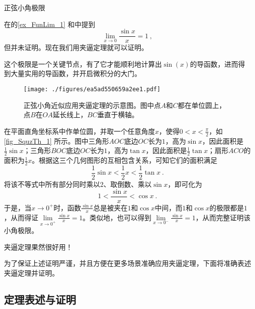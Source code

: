 \begin{example}{正弦小角极限}

在的\autoref{ex_FunLim_1} 和中提到
\begin{equation}
\lim_{x\to 0}\frac{\sin x}{x}=1~, 
\end{equation}
但并未证明。现在我们用夹逼定理就可以证明。

这个极限是一个关键节点，有了它才能顺利地计算出$\sin(x)$的导函数，进而得到大量实用的导函数，并开启微积分的大门。


\begin{figure}[ht]
\centering
\texttt{[image: ./figures/ea5ad550659a2ee1.pdf]}
\caption{正弦小角近似应用夹逼定理的示意图。图中点$A$和$C$都在单位圆上，点$B$在$OA$延长线上，$BC$垂直于横轴。} \label{fig_SquzTh_1}
\end{figure}


在平面直角坐标系中作单位圆，并取一个任意角度$x$，使得$0<x<\frac{\pi}{2}$，如\autoref{fig_SquzTh_1} 所示。图中三角形$AOC$底边$OC$长为$1$，高为$\sin x$，因此面积是$\frac{1}{2}\sin x$；三角形$BOC$底边$OC$长为$1$，高为$\tan x$，因此面积是$\frac{1}{2}\tan x$；扇形$ACO$的面积为$\frac{1}{2}x$。根据这三个几何图形的互相包含关系，可知它们的面积满足
\begin{equation}
\frac{1}{2}\sin x < \frac{1}{2}x < \frac{1}{2}\tan x~. 
\end{equation}
将该不等式中所有部分同时乘以$2$、取倒数、乘以$\sin x$，即可化为
\begin{equation}
1<\frac{\sin x}{x}<\cos x~. 
\end{equation}
于是，当$x\to 0^+$时，函数$\frac{\sin x}{x}$总是被夹在$1$和$\cos x$中间，而$1$和$\cos x$的极限都是$1$，从而得证$\lim\limits_{x\to 0^+}\frac{\sin x}{x}=1$。类似地，也可以得到$\lim\limits_{x\to 0^-}\frac{\sin x}{x}=1$，从而完整证明该小角极限。



\end{example}


夹逼定理果然很好用！

为了保证上述证明严谨，并且方便在更多场景准确应用夹逼定理，下面将准确表述夹逼定理并证明。




\subsection{定理表述与证明}







